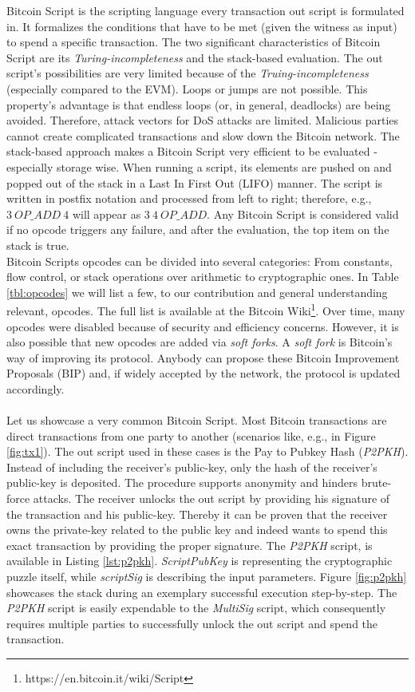 \documentclass{cacthesis}
\newcounter{protocol}
\begin{document}
        Bitcoin Script is the scripting language every transaction out script is formulated in. It formalizes the conditions that have to be met (given the witness as input) to spend a specific transaction. The two significant characteristics of Bitcoin Script are its \textit{Turing-incompleteness} and the stack-based evaluation. The out script's possibilities are very limited because of the \textit{Truing-incompleteness} (especially compared to the EVM). Loops or jumps are not possible. This property's advantage is that endless loops (or, in general, deadlocks) are being avoided. Therefore, attack vectors for DoS attacks are limited. Malicious parties cannot create complicated transactions and slow down the Bitcoin network. The stack-based approach makes a Bitcoin Script very efficient to be evaluated - especially storage wise. When running a script, its elements are pushed on and popped out of the stack in a Last In First Out (LIFO) manner. The script is written in postfix notation and processed from left to right; therefore, e.g., $3\ OP\_ADD \ 4$ will appear as $3\ 4\ OP\_ADD$. Any Bitcoin Script is considered valid if no opcode triggers any failure, and after the evaluation, the top item on the stack is true. \\
        Bitcoin Scripts opcodes can be divided into several categories: From constants, flow control, or stack operations over arithmetic to cryptographic ones. In Table \ref{tbl:opcodes} we will list a few, to our contribution and general understanding relevant, opcodes. The full list is available at the Bitcoin Wiki\footnote{https://en.bitcoin.it/wiki/Script}. Over time, many opcodes were disabled because of security and efficiency concerns. However, it is also possible that new opcodes are added via \textit{soft forks}. A \textit{soft fork} is Bitcoin's way of improving its protocol. Anybody can propose these Bitcoin Improvement Proposals (BIP) and, if widely accepted by the network, the protocol is updated accordingly. \\\\
        Let us showcase a very common Bitcoin Script. Most Bitcoin transactions are direct transactions from one party to another (scenarios like, e.g., in Figure \ref{fig:tx1}). The out script used in these cases is the Pay to Pubkey Hash (\textit{P2PKH}). Instead of including the receiver's public-key, only the hash of the receiver's public-key is deposited. The procedure supports anonymity and hinders brute-force attacks. The receiver unlocks the out script by providing his signature of the transaction and his public-key. Thereby it can be proven that the receiver owns the private-key related to the public key and indeed wants to spend this exact transaction by providing the proper signature. The \textit{P2PKH} script, is available in Listing \ref{lst:p2pkh}. \textit{ScriptPubKey} is representing the cryptographic puzzle itself, while \textit{scriptSig} is describing the input parameters. Figure \ref{fig:p2pkh} showcases the stack during an exemplary successful execution step-by-step. The \textit{P2PKH} script is easily expendable to the \textit{MultiSig} script, which consequently requires multiple parties to successfully unlock the out script and spend the transaction. \\
        
\end{document}
